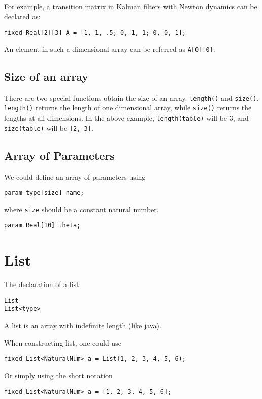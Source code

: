 \documentclass[12pt]{article}
\begin{document}
For example, a transition matrix in Kalman  filters with Newton dynamics can be declared as:
\begin{verbatim}
fixed Real[2][3] A = [1, 1, .5; 0, 1, 1; 0, 0, 1];
\end{verbatim}
An element in such a dimensional array can be referred as \texttt{A[0][0]}.


\subsection{Size of an array}
There are two special functions obtain the size of an array.
\texttt{length(\mycdot)} and \texttt{size(\mycdot)}.
\texttt{length(\mycdot)} returns the length of one dimensional array, while \texttt{size(\mycdot)} returns the lengths at all dimensions.
In the above example, \texttt{length(table)} will be 3, and \texttt{size(table)} will be \texttt{[2, 3]}.


\subsection {Array of Parameters}
We could define an array of parameters using
\begin{verbatim}
param type[size] name;
\end{verbatim}
where {\tt size} should be a constant natural number.

\begin{verbatim}
param Real[10] theta;
\end{verbatim}



\section{List}
The declaration of a list:
\begin{verbatim}
List 
List<type> 
\end{verbatim}
A list is an array with indefinite length (like java).

When constructing list, one could use 
\begin{verbatim}
fixed List<NaturalNum> a = List(1, 2, 3, 4, 5, 6);
\end{verbatim}
Or simply using the short notation
\begin{verbatim}
fixed List<NaturalNum> a = [1, 2, 3, 4, 5, 6];
\end{verbatim}
\end{document}
